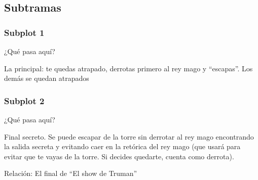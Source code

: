 \subsection{Subtramas}%


\subsubsection{Subplot 1}%
¿Qué pasa aquí?

La principal: te quedas atrapado, derrotas primero al rey mago y “escapas”. Los
demás se quedan atrapados

\subsubsection{Subplot 2}%
¿Qué pasa aquí?

Final secreto. Se puede escapar de la torre sin derrotar al rey mago encontrando
la salida secreta y evitando caer en la retórica del rey mago (que usará para
evitar que te vayas de la torre. Si decides quedarte, cuenta como derrota).

Relación: El final de “El show de Truman”